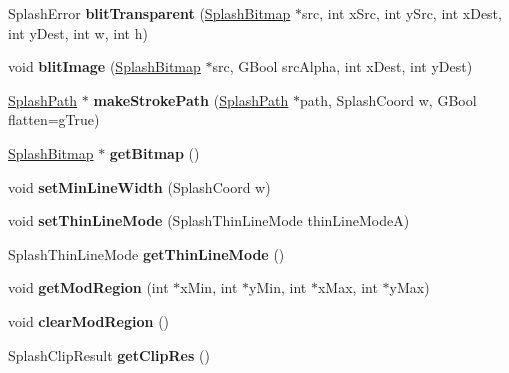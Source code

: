 \begin{DoxyCompactItemize}
Splash\+Error {\bfseries blit\+Transparent} (\hyperlink{class_splash_bitmap}{Splash\+Bitmap} $\ast$src, int x\+Src, int y\+Src, int x\+Dest, int y\+Dest, int w, int h)
\item 
\mbox{\label{class_splash_a2a2ff01b34df5947d9c4844ca2fbdf3d}} 
void {\bfseries blit\+Image} (\hyperlink{class_splash_bitmap}{Splash\+Bitmap} $\ast$src, G\+Bool src\+Alpha, int x\+Dest, int y\+Dest)
\item 
\mbox{\label{class_splash_aa24ad06d9e35f7125810c0602946eb25}} 
\hyperlink{class_splash_path}{Splash\+Path} $\ast$ {\bfseries make\+Stroke\+Path} (\hyperlink{class_splash_path}{Splash\+Path} $\ast$path, Splash\+Coord w, G\+Bool flatten=g\+True)
\item 
\mbox{\label{class_splash_a8473a3bc5bcdddddf132522d04cc4f23}} 
\hyperlink{class_splash_bitmap}{Splash\+Bitmap} $\ast$ {\bfseries get\+Bitmap} ()
\item 
\mbox{\label{class_splash_ab7fea98f63dfb69dce75771c690ba695}} 
void {\bfseries set\+Min\+Line\+Width} (Splash\+Coord w)
\item 
\mbox{\label{class_splash_a93525d02e77aefdf2b7f2279cc702863}} 
void {\bfseries set\+Thin\+Line\+Mode} (Splash\+Thin\+Line\+Mode thin\+Line\+ModeA)
\item 
\mbox{\label{class_splash_acdbd384da9c57b1f2e09cadaa0a9bfdb}} 
Splash\+Thin\+Line\+Mode {\bfseries get\+Thin\+Line\+Mode} ()
\item 
\mbox{\label{class_splash_a919d28d25ba20d436dde4b469650c1f3}} 
void {\bfseries get\+Mod\+Region} (int $\ast$x\+Min, int $\ast$y\+Min, int $\ast$x\+Max, int $\ast$y\+Max)
\item 
\mbox{\label{class_splash_a3fbe0c8a19a0888372258428f218e277}} 
void {\bfseries clear\+Mod\+Region} ()
\item 
\mbox{\label{class_splash_ad99c9dd98e82af01614d57971f45c2c0}} 
Splash\+Clip\+Result {\bfseries get\+Clip\+Res} ()
\item 
\mbox{\label{class_splash_a49b24530916151c116fafe8e72459075}} 

\end{DoxyCompactItemize}
